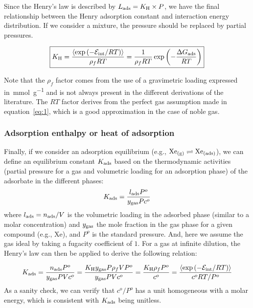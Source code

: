 \documentclass[main.tex]{subfiles}
\begin{document}
Since the Henry's law is described by $L_{\text{ads}}=K_{\text{H}} \times P$, we have the final relationship between the Henry adsorption constant and interaction energy distribution. If we consider a mixture, the pressure should be replaced by partial pressures.

\begin{equation}\label{eq:henry}
    \boxed{
    K_{\text{H}} = \dfrac{\langle \exp\left(-\mathcal{E}_{\text{int}}/RT\right) \rangle}{\rho_f RT} = \dfrac{1}{\rho_f RT} \exp\left(-\dfrac{\Delta G_{\text{ads}}}{RT}\right)
    }
\end{equation}

Note that the $\rho_f$ factor comes from the use of a gravimetric loading expressed in~\si{\milli\mole\per\gram} and is not always present in the different derivations of the literature.\autocite{PoreBlazer} The $RT$ factor derives from the perfect gas assumption made in equation~\ref{eq:1}, which is a good approximation in the case of noble gas. 


\subsubsection{Adsorption enthalpy or heat of adsorption}

Finally, if we consider an adsorption equilibrium (e.g., $\text{Xe}_{\text{(g)}} \rightleftharpoons \text{Xe}_{\text{(ads)}}$), we can define an equilibrium constant $K_{\text{ads}}$ based on the thermodynamic activities (partial pressure for a gas and volumetric loading for an adsorption phase) of the adsorbate in the different phases:
\begin{equation}
  K_{\text{ads}} = \dfrac{l_{\text{ads}}P^o}{y_{\text{gas}}Pc^o}
\end{equation}
where $l_{\text{ads}}=n_{\text{ads}}/V$ is the volumetric loading in the adsorbed phase (similar to a molar concentration) and $y_{\text{gas}}$ the mole fraction in the gas phase for a given compound (e.g., Xe), and $P^o$ is the standard pressure. And, here we assume the gas ideal by taking a fugacity coefficient of $1$. For a gas at infinite dilution, the Henry's law can then be applied to derive the following relation:

\begin{equation}\label{eq:eq_cst}
  K_{\text{ads}} = \dfrac{n_{\text{ads}}P^o}{y_{\text{gas}}PVc^o} = \dfrac{K_{\text{H}}y_{\text{gas}}P\rho_f V P^o}{y_{\text{gas}}PVc^o} = \dfrac{K_{\text{H}}\rho_f P^o}{c^o} = \dfrac{\langle \exp\left(-\mathcal{E}_{\text{int}}/RT\right) \rangle}{c^o RT/P^o}
\end{equation}
As a sanity check, we can verify that $c^o/P^o$ has a unit homogeneous with a molar energy, which is consistent with $K_{\text{ads}}$ being unitless.
\end{document}
